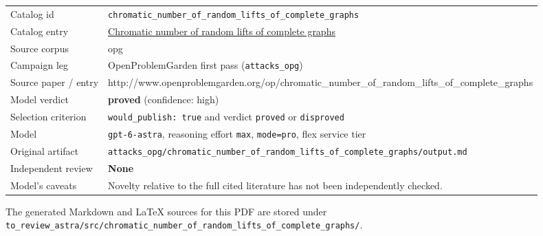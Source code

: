\documentclass[
  11pt,
  a4paper,
]{article}
\newcounter{none} %
\begin{document}
{\def\LTcaptype{none} %
\begin{longtable}[]{@{}
  >{\raggedright\arraybackslash}p{}
  >{\raggedright\arraybackslash}p{}@{}}
\toprule\noalign{}
\endhead
\bottomrule\noalign{}
\endlastfoot
Catalog id &
\texttt{chromatic\_number\_of\_random\_lifts\_of\_complete\_graphs} \\
Catalog entry &
\href{https://graph-theory-ai.github.io/graph-conjectures/op/chromatic_number_of_random_lifts_of_complete_graphs/}{Chromatic
number of random lifts of complete graphs} \\
Source corpus & opg \\
Campaign leg & OpenProblemGarden first pass (\texttt{attacks\_opg}) \\
Source paper / entry &
http://www.openproblemgarden.org/op/chromatic\_number\_of\_random\_lifts\_of\_complete\_graphs \\
Model verdict & \textbf{proved} (confidence: high) \\
Selection criterion & \texttt{would\_publish:\ true} and verdict
\texttt{proved} or \texttt{disproved} \\
Model & \texttt{gpt-6-astra}, reasoning effort \texttt{max},
\texttt{mode=pro}, flex service tier \\
Original artifact &
\texttt{attacks\_opg/chromatic\_number\_of\_random\_lifts\_of\_complete\_graphs/output.md} \\
Independent review & \textbf{None} \\
Model's caveats & Novelty relative to the full cited literature has not
been independently checked. \\
\end{longtable}
}

The generated Markdown and LaTeX sources for this PDF are stored under
\texttt{to\_review\_astra/src/chromatic\_number\_of\_random\_lifts\_of\_complete\_graphs/}.
\end{document}
